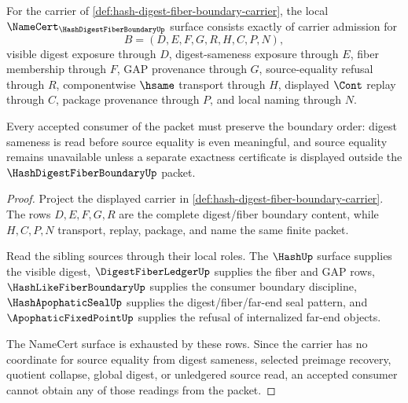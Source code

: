 \begin{theorem}
\label{thm:hash-digest-fiber-boundary-namecert-obligations}
For the carrier of \autoref{def:hash-digest-fiber-boundary-carrier}, the local $\NameCert_{\HashDigestFiberBoundaryUp}$ surface consists exactly of carrier admission for
$$
B=(D,E,F,G,R,H,C,P,N),
$$
visible digest exposure through $D$, digest-sameness exposure through $E$, fiber membership through $F$, GAP provenance through $G$, source-equality refusal through $R$, componentwise $\hsame$ transport through $H$, displayed $\Cont$ replay through $C$, package provenance through $P$, and local naming through $N$.

Every accepted consumer of the packet must preserve the boundary order: digest sameness is read before source equality is even meaningful, and source equality remains unavailable unless a separate exactness certificate is displayed outside the $\HashDigestFiberBoundaryUp$ packet.
\end{theorem}
\begin{proof}
Project the displayed carrier in \autoref{def:hash-digest-fiber-boundary-carrier}. The rows $D,E,F,G,R$ are the complete digest/fiber boundary content, while $H,C,P,N$ transport, replay, package, and name the same finite packet.

Read the sibling sources through their local roles. The $\HashUp$ surface supplies the visible digest, $\DigestFiberLedgerUp$ supplies the fiber and GAP rows, $\HashLikeFiberBoundaryUp$ supplies the consumer boundary discipline, $\HashApophaticSealUp$ supplies the digest/fiber/far-end seal pattern, and $\ApophaticFixedPointUp$ supplies the refusal of internalized far-end objects.

The NameCert surface is exhausted by these rows. Since the carrier has no coordinate for source equality from digest sameness, selected preimage recovery, quotient collapse, global digest, or unledgered source read, an accepted consumer cannot obtain any of those readings from the packet.
\end{proof}

